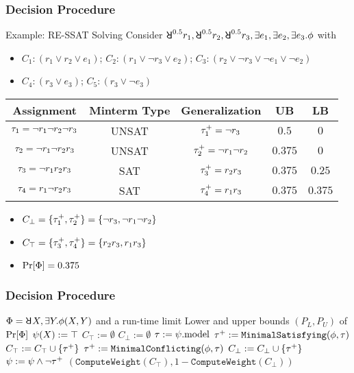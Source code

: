 \begin{frame}
  \frametitle{Decision Procedure}
  \begin{block}{Example: RE-SSAT Solving}
    Consider $\random{0.5}r_1,\random{0.5}r_2,\random{0.5}r_3,\exists e_1,\exists e_2,\exists e_3.\pf$ with
    \begin{itemize}
      \item[] $C_1: (r_1 \lor r_2 \lor e_1)$; $C_2: (r_1 \lor \lnot r_3 \lor e_2)$; $C_3: (r_2 \lor \lnot r_3 \lor \lnot e_1 \lor \lnot e_2)$
      \item[] $C_4: (r_3 \lor e_3)$; $C_5: (r_3 \lor \lnot e_3)$
    \end{itemize}
    \begin{table}[t]
      \centering
      \small
      \begin{tabular}{c|c|c|c|c}
        Assignment                            & Minterm Type & Generalization                & UB      & LB      \\
        \hline
        $\tau_1=\lnot r_1 \lnot r_2 \lnot r_3$ & UNSAT        & $\tau_1^+=\lnot r_3$           & $0.5$   & $0$     \\
        $\tau_2=\lnot r_1 \lnot r_2 r_3$       & UNSAT        & $\tau_2^+=\lnot r_1 \lnot r_2$ & $0.375$ & $0$     \\
        $\tau_3=\lnot r_1 r_2 r_3$             & SAT          & $\tau_3^+=r_2r_3$              & $0.375$ & $0.25$  \\
        $\tau_4=r_1 \lnot r_2 r_3$             & SAT          & $\tau_4^+=r_1r_3$              & $0.375$ & $0.375$
      \end{tabular}
    \end{table}
    \begin{itemize}
      \item $C_\bot=\{\tau_1^+,\tau_2^+\}=\{\lnot r_3,\lnot r_1 \lnot r_2\}$
      \item $C_\top=\{\tau_3^+,\tau_4^+\}=\{r_2r_3,r_1r_3\}$
      \item $\Pr[\Phi]=0.375$
    \end{itemize}
  \end{block}
\end{frame}

\begin{frame}
  \frametitle{Decision Procedure}
  {\scriptsize
    \begin{algorithmic}[1]
      \REQUIRE
      $\Qf=\random{} X,\exists Y.\pf(X,Y)$ and a run-time limit \timeout
      \ENSURE
      Lower and upper bounds $(P_L,P_U)$ of $\Pr[\Phi]$
      \STATE $\psi(X) := \top$
      \STATE $C_\top := \emptyset$
      \STATE $C_\bot := \emptyset$
      \STATE $\tau := \psi.\mathrm{model}$
      \IF{($\sat{\pcf{\pf}{\as}}$)}
      \STATE $\tau^+ := \texttt{MinimalSatisfying}(\phi,\tau)$
      \STATE $C_\top := C_\top \cup \{\tau^+\}$
      \ELSE
      \STATE $\tau^+ := \texttt{MinimalConflicting}(\phi,\tau)$
      \STATE $C_\bot := C_\bot \cup \{\tau^+\}$
      \ENDIF
      \STATE $\psi := \psi \land \lnot\tau^+$
      \ENDWHILE
      \RETURN $(\texttt{ComputeWeight}(C_\top),1-\texttt{ComputeWeight}(C_\bot))$
    \end{algorithmic}
  }
\end{frame}